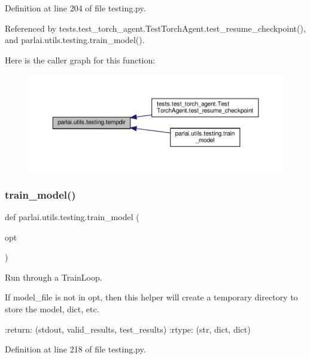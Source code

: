 Definition at line 204 of file testing.\+py.



Referenced by tests.\+test\+\_\+torch\+\_\+agent.\+Test\+Torch\+Agent.\+test\+\_\+resume\+\_\+checkpoint(), and parlai.\+utils.\+testing.\+train\+\_\+model().

Here is the caller graph for this function\+:
\nopagebreak
\begin{figure}[H]
\begin{center}
\leavevmode
\includegraphics[width=350pt]{namespaceparlai_1_1utils_1_1testing_a0945b769a10c0c844b29c02ff26445a5_icgraph}
\end{center}
\end{figure}
\mbox{\label{namespaceparlai_1_1utils_1_1testing_a005734981469efed8a992bf5edc3ca8a}} 
\subsubsection{\texorpdfstring{train\+\_\+model()}{train\_model()}}
{\footnotesize\ttfamily def parlai.\+utils.\+testing.\+train\+\_\+model (\begin{DoxyParamCaption}\item[{}]{opt }\end{DoxyParamCaption})}

\begin{DoxyVerb}Run through a TrainLoop.

If model_file is not in opt, then this helper will create a temporary
directory to store the model, dict, etc.

:return: (stdout, valid_results, test_results)
:rtype: (str, dict, dict)
\end{DoxyVerb}
 

Definition at line 218 of file testing.\+py.



